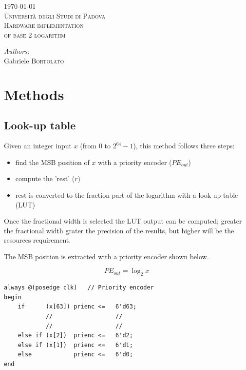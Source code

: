 \documentclass[12pt]{article}
\begin{document}
\begin{titlepage}

\center 

{\large \today}\\[2cm] 

\textsc{\LARGE Università degli Studi di Padova}\\[1.5cm]


\textsc{\Large Hardware implementation \\ of base 2 logarithm}\\[0.5cm] 


\begin{minipage}{0.4\textwidth}
\large
\emph{Authors:} \\
Gabriele \textsc{Bortolato} \\
\end{minipage}

\vfill 

\end{titlepage}

\section{Methods}
\subsection{Look-up table}
Given an integer input $x$ (from $0$ to $2^{64}-1$), this method follows three steps:
\begin{itemize}
    \item find the MSB position of $x$ with a priority encoder ($PE_{out}$) 
    \item compute the 'rest' ($r$)
    \item rest is converted to the fraction part of the logarithm with a look-up table (LUT) 
\end{itemize}
Once the fractional width is selected the LUT output can be computed; greater the fractional width grater the precision of the results, but higher will be the resources requirement.  

The MSB position is extracted with a priority encoder shown below. 

\begin{equation}
    PE_{out} = \log_2{x}
\end{equation}

\begin{lstlisting}[style={verilog-style}]
always @(posedge clk)   // Priority encoder
begin
    if      (x[63]) prienc <=   6'd63;
            //                  //
            //                  //
    else if (x[2])  prienc <=   6'd2;
    else if (x[1])  prienc <=   6'd1;
    else            prienc <=   6'd0;
end
\end{lstlisting}
\end{document}
